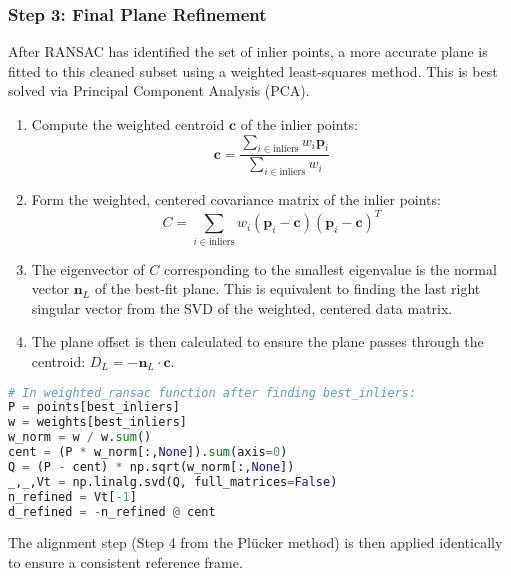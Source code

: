 \documentclass{article}
\begin{document}
\subsubsection{Step 3: Final Plane Refinement}
After RANSAC has identified the set of inlier points, a more accurate plane is fitted to this cleaned subset using a weighted least-squares method. This is best solved via Principal Component Analysis (PCA).
\begin{enumerate}
    \item Compute the weighted centroid $\mathbf{c}$ of the inlier points:
    \begin{equation}
    \mathbf{c} = \frac{\sum_{i \in \text{inliers}} w_i \mathbf{p}_i}{\sum_{i \in \text{inliers}} w_i}
    \end{equation}
    \item Form the weighted, centered covariance matrix of the inlier points:
    \begin{equation}
    C = \sum_{i \in \text{inliers}} w_i (\mathbf{p}_i - \mathbf{c})(\mathbf{p}_i - \mathbf{c})^T
    \end{equation}
    \item The eigenvector of $C$ corresponding to the smallest eigenvalue is the normal vector $\mathbf{n}_L$ of the best-fit plane. This is equivalent to finding the last right singular vector from the SVD of the weighted, centered data matrix.
    \item The plane offset is then calculated to ensure the plane passes through the centroid: $D_L = -\mathbf{n}_L \cdot \mathbf{c}$.
\end{enumerate}

\begin{lstlisting}[language=Python]
# In weighted_ransac function after finding best_inliers:
P = points[best_inliers]
w = weights[best_inliers]
w_norm = w / w.sum()
cent = (P * w_norm[:,None]).sum(axis=0)
Q = (P - cent) * np.sqrt(w_norm[:,None])
_,_,Vt = np.linalg.svd(Q, full_matrices=False)
n_refined = Vt[-1]
d_refined = -n_refined @ cent
\end{lstlisting}
The alignment step (Step 4 from the Pl\"ucker method) is then applied identically to ensure a consistent reference frame.
\end{document}
